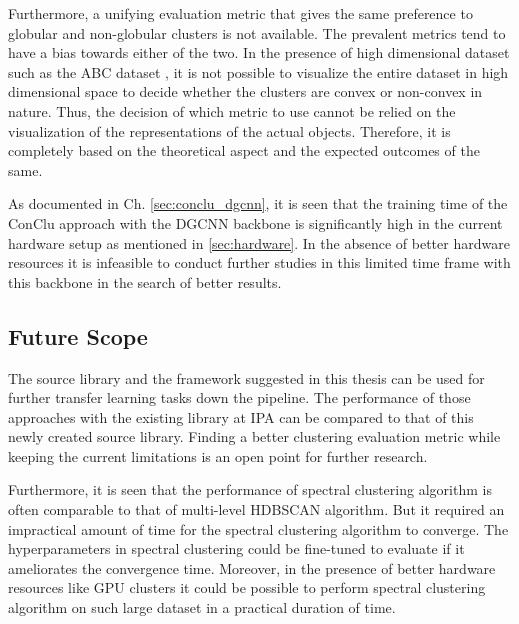 \vspace{5mm}

Furthermore, a unifying evaluation metric that gives the same preference to globular and non-globular clusters is not available. The prevalent metrics tend to have a bias towards either of the two. In the presence of high dimensional dataset such as the ABC dataset \cite{Koch_2019_CVPR}, it is not possible to visualize the entire dataset in high dimensional space to decide whether the clusters are convex or non-convex in nature. Thus, the decision of which metric to use cannot be relied on the visualization of the representations of the actual objects. Therefore, it is completely based on the theoretical aspect and the expected outcomes of the same. 

\vspace{5mm}
As documented in Ch. \ref{sec:conclu_dgcnn}, it is seen that the training time of the ConClu approach with the \ac{DGCNN} backbone is significantly high in the current hardware setup as mentioned in \ref{sec:hardware}. In the absence of better hardware resources it is infeasible to conduct further studies in this limited time frame with this backbone in the search of better results. 

\subsection{Future Scope}

The source library and the framework suggested in this thesis can be used for further transfer learning tasks down the pipeline. The performance of those approaches with the existing library at \ac{IPA} can be compared to that of this newly created source library. Finding a better clustering evaluation metric while keeping the current limitations is an open point for further research. 

\vspace{5mm}

Furthermore, it is seen that the performance of spectral clustering algorithm is often comparable to that of multi-level \ac{HDBSCAN} algorithm. But it required an impractical amount of time for the spectral clustering algorithm to converge. The hyperparameters in spectral clustering could be fine-tuned to evaluate if it ameliorates the convergence time. Moreover, in the presence of better hardware resources like \ac{GPU} clusters it could be possible to perform spectral clustering algorithm on such large dataset in a practical duration of time. 

